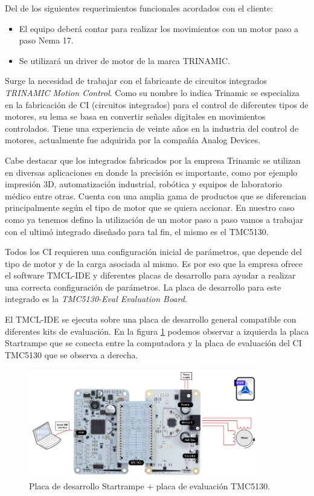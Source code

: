 Del de los siguientes requerimientos funcionales acordados con el cliente:
			
\begin{itemize}
\item El equipo deberá contar para realizar los movimientos con un motor paso a paso Nema 17.
\item Se utilizará un driver de motor de la marca TRINAMIC.
\end{itemize}

Surge la necesidad de trabajar con el fabricante de circuitos integrados \textit{TRINAMIC Motion Control}\citep{3_web_trinamic}. Como su nombre lo indica Trinamic se especializa en la fabricación de CI (circuitos integrados) para el control de diferentes tipos de motores, su lema se basa en convertir señales digitales en movimientos controlados. Tiene una experiencia de veinte años en la industria del control de motores, actualmente fue adquirida por la compañía Analog Devices.

Cabe destacar que los integrados fabricados por la empresa Trinamic se utilizan en diversas aplicaciones en donde la precisión es importante, como por ejemplo impresión 3D, automatización industrial, robótica y equipos de laboratorio médico entre otras.
Cuenta con una amplia gama de productos que se diferencian principalmente según el tipo de motor que se quiera accionar. En nuestro caso como ya tenemos defino la utilización de un motor paso a paso vamos a trabajar con el ultimó integrado diseñado para tal fin, el mismo es el TMC5130. 
  
Todos los CI requieren una configuración inicial de parámetros, que depende del tipo de  motor y de la carga asociada al mismo. Es por eso que la empresa ofrece el software TMCL-IDE  y diferentes placas de desarrollo para ayudar a realizar una correcta configuración de parámetros. La placa de desarrollo para este integrado es la \textit{TMC5130-Eval Evaluation Board}.

El TMCL-IDE se ejecuta sobre una placa de desarrollo general compatible con diferentes kits de evaluación. En la figura \ref{fig:tmc5130_placa} podemos observar a izquierda la placa Startrampe  que se conecta entre la computadora y la placa de evaluación del CI TMC5130 que se observa a derecha.

\begin{figure}[htpb]
\centering 
\includegraphics[width=0.9\textwidth]{./Figures/tmc5130_placa.png}
\caption{Placa de desarrollo Startrampe + placa de evaluación TMC5130.}
\label{fig:tmc5130_placa}
\end{figure}



